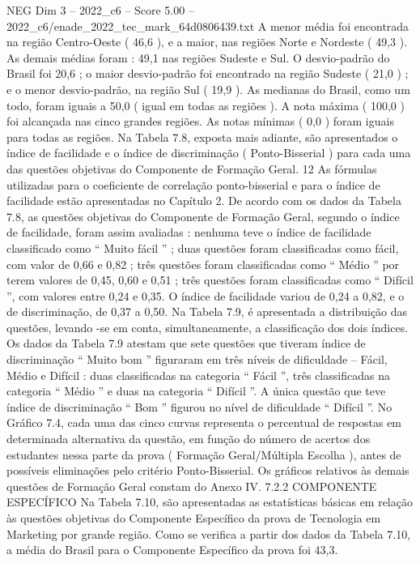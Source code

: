 \begin{textsample}{NEG Dim 3 – 2022\_c6 – Score 5.00 – 2022\_c6/enade\_2022\_tec\_mark\_64d0806439.txt}
A menor média foi encontrada na região Centro-Oeste ( 46,6 ), e a maior, nas regiões Norte e Nordeste ( 49,3 ).
As demais médias foram : 49,1 nas regiões Sudeste e Sul.
O desvio-padrão do Brasil foi 20,6 ; o maior desvio-padrão foi encontrado na região Sudeste ( 21,0 ) ; e o menor desvio-padrão, na região Sul ( 19,9 ).
As medianas do Brasil, como um todo, foram iguais a 50,0 ( igual em todas as regiões ).
A nota máxima ( 100,0 ) foi alcançada nas cinco grandes regiões.
As notas mínimas ( 0,0 ) foram iguais para todas as regiões.
Na Tabela 7.8, exposta mais adiante, são apresentados o índice de facilidade e o índice de discriminação ( Ponto-Bisserial ) para cada uma das questões objetivas do Componente de Formação Geral. 12 As fórmulas utilizadas para o coeficiente de correlação ponto-bisserial e para o índice de facilidade estão apresentadas no Capítulo 2.
De acordo com os dados da Tabela 7.8, as questões objetivas do Componente de Formação Geral, segundo o índice de facilidade, foram assim avaliadas : nenhuma teve o índice de facilidade classificado como “ Muito fácil ” ; duas questões foram classificadas como fácil, com valor de 0,66 e 0,82 ; três questões foram classificadas como “ Médio ” por terem valores de 0,45, 0,60 e 0,51 ; três questões foram classificadas como “ Difícil ”, com valores entre 0,24 e 0,35.
O índice de facilidade variou de 0,24 a 0,82, e o de discriminação, de 0,37 a 0,50.
Na Tabela 7.9, é apresentada a distribuição das questões, levando -se em conta, simultaneamente, a classificação dos dois índices.
Os dados da Tabela 7.9 atestam que sete questões que tiveram índice de discriminação “ Muito bom ” figuraram em três níveis de dificuldade – Fácil, Médio e Difícil : duas classificadas na categoria “ Fácil ”, três classificadas na categoria “ Médio ” e duas na categoria “ Difícil ”.
A única questão que teve índice de discriminação “ Bom ” figurou no nível de dificuldade “ Difícil ”.
No Gráfico 7.4, cada uma das cinco curvas representa o percentual de respostas em determinada alternativa da questão, em função do número de acertos dos estudantes nessa parte da prova ( Formação Geral/Múltipla Escolha ), antes de possíveis eliminações pelo critério Ponto-Bisserial.
Os gráficos relativos às demais questões de Formação Geral constam do Anexo IV. 7.2.2 COMPONENTE ESPECÍFICO Na Tabela 7.10, são apresentadas as estatísticas básicas em relação às questões objetivas do Componente Específico da prova de Tecnologia em Marketing por grande região.
Como se verifica a partir dos dados da Tabela 7.10, a média do Brasil para o Componente Específico da prova foi 43,3.

\end{textsample}
